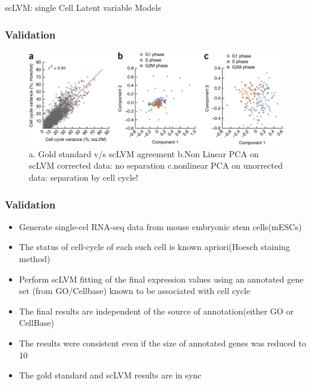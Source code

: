 \documentclass[10pt, compress]{beamer}
\renewcommand{\(}{\begin{columns}}
\renewcommand{\)}{\end{columns}}
\newcommand{\<}[1]{\begin{column}{#1}}
\renewcommand{\>}{\end{column}}
\begin{document}
\begin{frame}
scLVM: single Cell Latent variable Models
\frametitle{Validation}
\begin{figure}
\includegraphics[width=0.8\linewidth]{images/results1.jpg}
\caption{a. Gold standard v/s scLVM agreement
b.Non Linear PCA on scLVM corrected data: no separation c.nonlinear PCA on unorrected data: separation by cell cycle!}
\end{figure}
\end{frame}


\begin{frame}
\frametitle{Validation}
\begin{itemize}[<+- | alert@+>]
\item Generate single-cel RNA-seq data from mouse embryonic stem cells(mESCs)
\item The status of cell-cycle of each such cell is known apriori(Hoesch staining method)
\item Perform scLVM fitting of the final expression values using an annotated gene set (from GO/Cellbase) known to be associated
with cell cycle
\item The final results are independent of the source of annotation(either GO or CellBase)
\item The results were consistent even if the size of annotated genes was reduced to 10
\item The gold standard and scLVM results are in sync
\end{itemize}
\end{frame}
\end{document}
